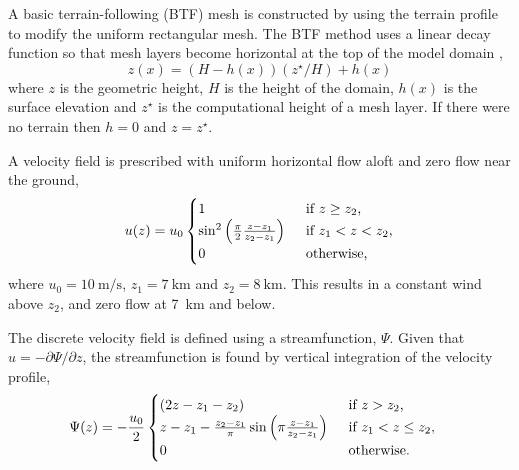 A basic terrain-following (BTF) mesh is constructed by using the terrain profile to modify the uniform rectangular mesh.
The BTF method uses a linear decay function so that mesh layers become horizontal at the top of the model domain \citep{galchen-somerville1975a},
\begin{equation}
	z(x) = \left( H - h(x) \right) \left( z^\star / H \right) + h(x) \label{eqn:btf}
\end{equation}
where $z$ is the geometric height, $H$ is the height of the domain, $h(x)$ is the surface elevation and $z^\star$ is the computational height of a mesh layer.  If there were no terrain then $h = 0$ and $z = z^\star$.

A velocity field is prescribed with uniform horizontal flow aloft and zero flow near the ground,
\begin{align}
	u(z) = u_0 \begin{cases}
		1 & \enskip \text{if $z \geq z_2$,} \\
		\sin^2 \left( \frac{\pi}{2} \frac{z - z_1}{z_2 - z_1} \right) & \enskip \text{if $z_1 < z < z_2$,} \\
		0 & \enskip \text{otherwise,}
	\end{cases}
\end{align}
where $u_0 = \SI{10}{\meter\per\second}$, $z_1 = \SI{7}{\kilo\meter}$ and $z_2 = \SI{8}{\kilo\meter}$.
This results in a constant wind above $z_2$, and zero flow at \SI{7}{\kilo\meter} and below.

The discrete velocity field is defined using a streamfunction, \(\Psi\).  Given that \(u = -\partial \Psi / \partial z\), the streamfunction is found by vertical integration of the velocity profile,
\begin{align}
	\Psi(z) &= -\frac{u_0}{2}
	\begin{cases}
		\left( 2z - z_1 - z_2 \right) & \enskip \text{if $z > z_2$,} \\
		z - z_1 - \frac{z_2 - z_1}{\pi} \sin \left(\pi \frac{z - z_1}{z_2-z_1}\right) & \enskip \text{if $z_1 < z \leq z_2$,} \\
		0 & \enskip \text{otherwise.}
	\end{cases}
\end{align}

